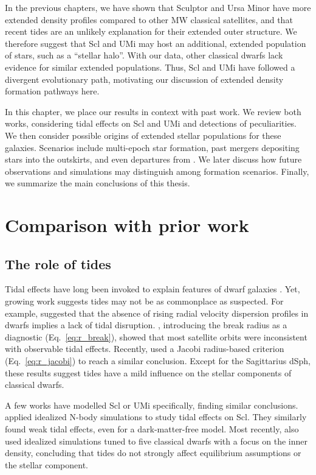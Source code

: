 In the previous chapters, we have shown that Sculptor and Ursa Minor
have more extended density profiles compared to other MW classical
satellites, and that recent tides are an unlikely explanation for their
extended outer structure. We therefore suggest that Scl and UMi may host
an additional, extended population of stars, such as a ``stellar halo''.
With our data, other classical dwarfs lack evidence for similar extended
populations. Thus, Scl and UMi have followed a divergent evolutionary
path, motivating our discussion of extended density formation pathways
here.

In this chapter, we place our results in context with past work. We
review both works, considering tidal effects on Scl and UMi and
detections of peculiarities. We then consider possible origins of
extended stellar populations for these galaxies. Scenarios include
multi-epoch star formation, past mergers depositing stars into the
outskirts, and even departures from \LCDM{}. We later discuss how future
observations and simulations may distinguish among formation scenarios.
Finally, we summarize the main conclusions of this thesis.

\section{Comparison with prior work}\label{comparison-with-prior-work}

\subsection{The role of tides}\label{the-role-of-tides}

Tidal effects have long been invoked to explain features of dwarf
galaxies \citep[e.g.,
Section~\ref{sec:scl_umi_obs_tides},][]{mayer+2001a, tsujimoto+shigeyama2002}.
Yet, growing work suggests tides may not be as commonplace as suspected.
For example, \citet{read+2006} suggested that the absence of rising
radial velocity dispersion profiles in dwarfs implies a lack of tidal
disruption. \citet{penarrubia+2009}, introducing the break radius as a
diagnostic (Eq.~\ref{eq:r_break}), showed that most satellite orbits
were inconsistent with observable tidal effects. Recently,
\citet{pace+erkal+li2022} used a Jacobi radius-based criterion
(Eq.~\ref{eq:r_jacobi}) to reach a similar conclusion. Except for the
Sagittarius dSph, these results suggest tides have a mild influence on
the stellar components of classical dwarfs.

A few works have modelled Scl or UMi specifically, finding similar
conclusions. \citet{iorio+2019} applied idealized N-body simulations to
study tidal effects on Scl. They similarly found weak tidal effects,
even for a dark-matter-free model. Most recently,
\citet{tchiorniy+genina2025} also used idealized simulations tuned to
five classical dwarfs with a focus on the inner density, concluding that
tides do not strongly affect equilibrium assumptions or the stellar
component.


